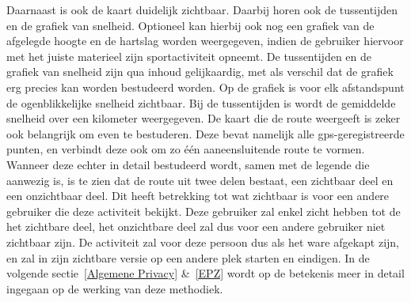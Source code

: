 Daarnaast is ook de kaart duidelijk zichtbaar. Daarbij horen ook de
tussentijden en de grafiek van snelheid. Optioneel kan hierbij ook nog een
grafiek van de afgelegde hoogte en de hartslag worden weergegeven, indien de
gebruiker hiervoor met het juiste materieel zijn sportactiviteit opneemt. De
tussentijden en de grafiek van snelheid zijn qua inhoud gelijkaardig, met als
verschil dat de grafiek erg precies kan worden bestudeerd worden. Op de grafiek
is voor elk afstandspunt de ogenblikkelijke snelheid zichtbaar. Bij de
tussentijden is wordt de gemiddelde snelheid over een kilometer weergegeven. De
kaart die de route weergeeft is zeker ook belangrijk om even te bestuderen.
Deze bevat namelijk alle gps-geregistreerde punten, en verbindt deze ook om zo
één aaneensluitende route te vormen. Wanneer deze echter in detail bestudeerd
wordt, samen met de legende die aanwezig is, is te zien dat de route uit twee
delen bestaat, een zichtbaar deel en een onzichtbaar deel. Dit heeft betrekking
tot wat zichtbaar is voor een andere gebruiker die deze activiteit bekijkt.
Deze gebruiker zal enkel zicht hebben tot de het zichtbare deel, het
onzichtbare deel zal dus voor een andere gebruiker niet zichtbaar zijn. De
activiteit zal voor deze persoon dus als het ware afgekapt zijn, en zal in zijn
zichtbare versie op een andere plek starten en eindigen. In de volgende
sectie~\ref{Algemene Privacy} \&~\ref{EPZ} wordt op de betekenis meer in detail
ingegaan op de werking van deze methodiek.

